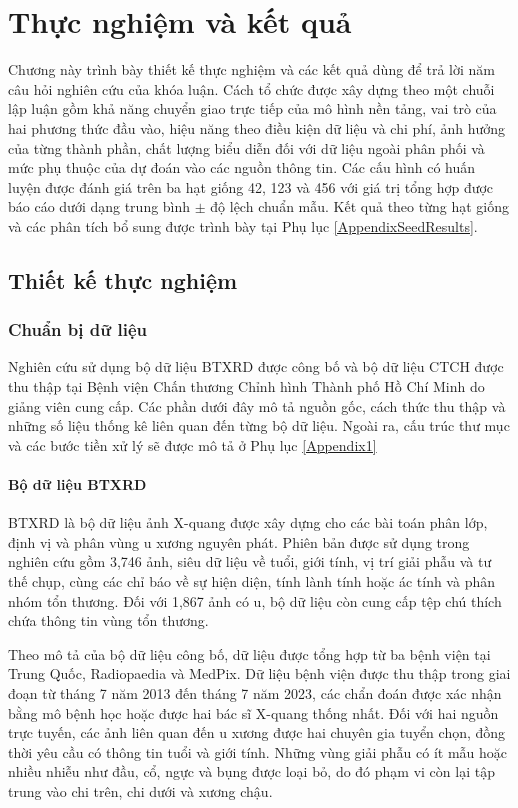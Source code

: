 \chapter{Thực nghiệm và kết quả}
\label{Chapter4}
Chương này trình bày thiết kế thực nghiệm và các kết quả dùng để trả lời năm câu hỏi nghiên cứu của khóa luận. Cách tổ chức được xây dựng theo một chuỗi lập luận gồm khả năng chuyển giao trực tiếp của mô hình nền tảng, vai trò của hai phương thức đầu vào, hiệu năng theo điều kiện dữ liệu và chi phí, ảnh hưởng của từng thành phần, chất lượng biểu diễn đối với dữ liệu ngoài phân phối và mức phụ thuộc của dự đoán vào các nguồn thông tin. Các cấu hình có huấn luyện được đánh giá trên ba hạt giống 42, 123 và 456 với giá trị tổng hợp được báo cáo dưới dạng trung bình $\pm$ độ lệch chuẩn mẫu. Kết quả theo từng hạt giống và các phân tích bổ sung được trình bày tại Phụ lục \ref{AppendixSeedResults}.

\section{Thiết kế thực nghiệm}
\label{sec:experimental_design}

\subsection{Chuẩn bị dữ liệu}
Nghiên cứu sử dụng bộ dữ liệu BTXRD \cite{Yao2025} được công bố và bộ dữ liệu CTCH được thu thập tại Bệnh viện Chấn thương Chỉnh hình Thành phố Hồ Chí Minh do giảng viên cung cấp. Các phần dưới đây mô tả nguồn gốc, cách thức thu thập và những số liệu thống kê liên quan đến từng bộ dữ liệu. Ngoài ra, cấu trúc thư mục và các bước tiền xử lý sẽ được mô tả ở Phụ lục \ref{Appendix1}

\subsubsection{Bộ dữ liệu BTXRD}
\label{subsec:btxrd-dataset}

BTXRD là bộ dữ liệu ảnh X-quang được xây dựng cho các bài toán phân lớp, định vị và phân vùng u xương nguyên phát. Phiên bản được sử dụng trong nghiên cứu gồm 3,746 ảnh, siêu dữ liệu về tuổi, giới tính, vị trí giải phẫu và tư thế chụp, cùng các chỉ báo về sự hiện diện, tính lành tính hoặc ác tính và phân nhóm tổn thương. Đối với 1,867 ảnh có u, bộ dữ liệu còn cung cấp tệp chú thích chứa thông tin vùng tổn thương.

Theo mô tả của bộ dữ liệu công bố, dữ liệu được tổng hợp từ ba bệnh viện tại Trung Quốc, Radiopaedia và MedPix. Dữ liệu bệnh viện được thu thập trong giai đoạn từ tháng 7 năm 2013 đến tháng 7 năm 2023, các chẩn đoán được xác nhận bằng mô bệnh học hoặc được hai bác sĩ X-quang thống nhất. Đối với hai nguồn trực tuyến, các ảnh liên quan đến u xương được hai chuyên gia tuyển chọn, đồng thời yêu cầu có thông tin tuổi và giới tính. Những vùng giải phẫu có ít mẫu hoặc nhiều nhiễu như đầu, cổ, ngực và bụng được loại bỏ, do đó phạm vi còn lại tập trung vào chi trên, chi dưới và xương chậu.

